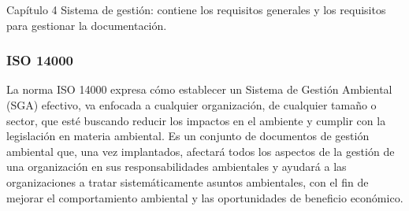 Capítulo 4 Sistema de gestión: contiene los requisitos generales y los requisitos para gestionar la documentación.\\

\subsubsection{ISO 14000}
La norma ISO 14000 expresa cómo establecer un Sistema de Gestión Ambiental (SGA) efectivo, va enfocada a cualquier organización, de cualquier tamaño o sector, que esté buscando reducir los impactos en el ambiente y cumplir con la legislación en materia ambiental. Es un conjunto de documentos de gestión ambiental que, una vez implantados, afectará todos los aspectos de la gestión de una organización en sus responsabilidades ambientales y ayudará a las organizaciones a tratar sistemáticamente asuntos ambientales, con el fin de mejorar el comportamiento ambiental y las oportunidades de beneficio económico.
